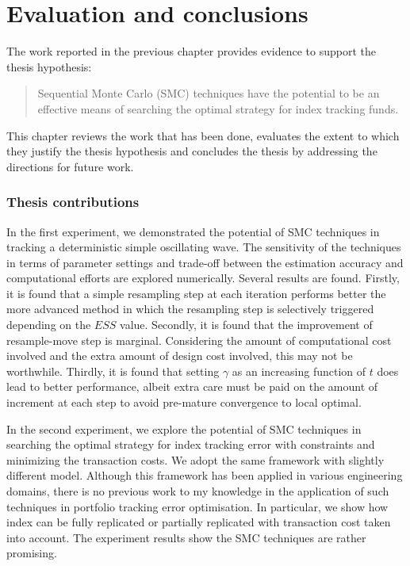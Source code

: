 \chapter{Evaluation and conclusions}
\graphicspath{{Chapter5/figures/}}
\label{EvaluationAndConclusion}
The work reported in the previous chapter provides evidence to support
the thesis hypothesis:
\begin{quote}
Sequential Monte Carlo (SMC) techniques have the potential to be an effective means of searching the optimal strategy for index tracking funds.
\end{quote}
This chapter reviews the work that has been done, evaluates the extent
to which they justify the thesis hypothesis and concludes the thesis
by addressing the directions for future work.

\subsection{Thesis contributions}
In the first experiment, we demonstrated the potential of SMC techniques in tracking a deterministic simple oscillating wave. The sensitivity of the techniques in terms of parameter settings and trade-off between the estimation accuracy and computational efforts are explored numerically. Several results are found. Firstly, it is found that a simple resampling step at each iteration performs better the more advanced method in which the resampling step is selectively triggered depending on the $ESS$ value. Secondly, it is found that the improvement of resample-move step is marginal. Considering the amount of computational cost involved and the extra amount of design cost involved, this may not be worthwhile. Thirdly, it is found that setting $\gamma$ as an increasing function of $t$ does lead to better performance, albeit extra care must be paid on the amount of increment at each step to avoid pre-mature convergence to local optimal. 

In the second experiment, we explore the potential of SMC techniques in searching the optimal strategy for index tracking error with constraints and minimizing the transaction costs. We adopt the same framework with slightly different model. Although this framework has been applied in various engineering domains, there is no previous work to my knowledge in the application of such techniques in portfolio tracking error optimisation. In particular, we show how index can be fully replicated or partially replicated with transaction cost taken into account. The experiment results show the SMC techniques are rather promising.

